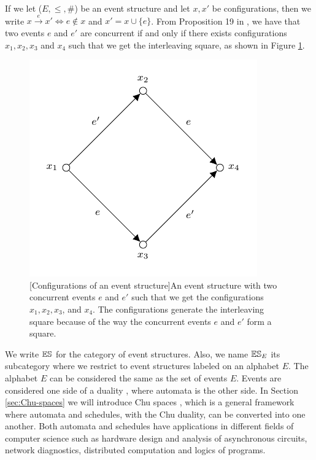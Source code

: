 If we let ($E, \leq, \#$) be an event structure and let $x, x'$ be configurations, then we write $x \xrightarrow{e} x' \Leftrightarrow e \notin x$ and $x' = x \cup \{e\}$. From Proposition 19 in \cite{winskel95modelsCategory}, we have that two events $e$ and $e'$ are concurrent if and only if there exists configurations $x_1, x_2, x_3$ and $x_4$ such that we get the interleaving square, as shown in Figure \ref{fig:interleaving-square-event-structure}.

\begin{figure}[ht]
        \centering
        \includegraphics[scale=1.2]{Figures/2.Models-for-concurrency/event-structure/interleaving-square.pdf}
        [Configurations of an event structure]{An event structure with two concurrent events $e$ and $e'$ such that we get the configurations $x_{1}, x_{2}, x_{3}$, and $x_{4}$. The configurations generate the interleaving square because of the way the concurrent events $e$ and $e'$ form a square.}
        \label{fig:interleaving-square-event-structure}
\end{figure}

 We write $\mathbb{ES}$ for the category of event structures. Also, we name $\mathbb{ES}_{E}$ its subcategory where we restrict to event structures labeled on an alphabet $E$. The alphabet $E$ can be considered the same as the set of events $E$. Events are considered one side of a duality \cite{Pratt02eventStateDuality}, where automata is the other side. In Section \ref{sec:Chu-spaces} we will introduce Chu spaces \cite{gupta94phd_Chu}, which is a general framework where automata and schedules, with the Chu duality, can be converted into one another. Both automata and schedules have applications in different fields of computer science such as hardware design and analysis of asynchronous circuits, network diagnostics, distributed computation and logics of programs. 